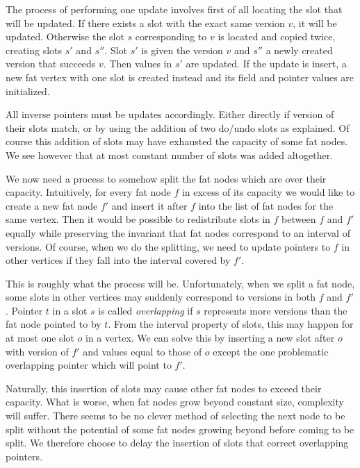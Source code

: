The process of performing one update involves first of all locating the slot that will be updated. If there exists a slot with the exact same version $v$, it will be updated. Otherwise the slot $s$ corresponding to $v$ is located and copied twice, creating slots $s'$ and $s''$. Slot $s'$ is given the version $v$ and $s''$ a newly created version that succeeds $v$. Then values in $s'$ are updated.
If the update is insert, a new fat vertex with one slot is created instead and its field and pointer values are initialized.

All inverse pointers must be updates accordingly. Either directly if version of their slots match, or by using the addition of two do/undo slots as explained. Of course this addition of slots may have exhausted the capacity of some fat nodes. We see however that at most constant number of slots was added altogether. 

We now need a process to somehow split the fat nodes which are over their capacity. Intuitively, for every fat node $f$ in excess of its capacity we would like to create a new fat node $f'$ and insert it after $f$ into the list of fat nodes for the same vertex. Then it would be possible to redistribute slots in $f$ between $f$ and $f'$ equally while preserving the invariant that fat nodes correspond to an interval of versions. Of course, when we do the splitting, we need to update pointers to $f$ in other vertices if they fall into the interval covered by $f'$.

This is roughly what the process will be. Unfortunately, when we split a fat node, some slots in other vertices may suddenly correspond to versions in both $f$ and $f'$. Pointer $t$ in a slot $s$ is called \emph{overlapping} if $s$ represents more versions than the fat node pointed to by $t$.
From the interval property of slots, this may happen for at most one slot $o$ in a vertex. We can solve this by inserting a new slot after $o$ with version of $f'$ and values equal to those of $o$ except the one problematic overlapping pointer which will point to $f'$.

Naturally, this insertion of slots may cause other fat nodes to exceed their capacity. What is worse, when fat nodes grow beyond constant size, complexity will suffer. There seems to be no clever method of selecting the next node to be split without the potential of some fat nodes growing beyond  before coming to be split. We therefore choose to delay the insertion of slots that correct overlapping pointers.

